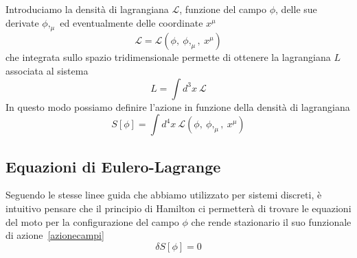     Introduciamo la densità di lagrangiana $\mathcal L$, funzione del campo $\phi$, delle sue derivate $\phi,_\mu$ ed eventualmente delle coordinate $x^\mu$
    \begin{equation} \label{lagrangianacampi}
        \mathcal L = \mathcal L (\phi,~\phi,_\mu,~x^\mu)
    \end{equation}
    che integrata sullo spazio tridimensionale permette di ottenere la lagrangiana $L$ associata al sistema
    \begin{equation*}
        L = \int d^3 x ~ \mathcal L
    \end{equation*}
    In questo modo possiamo definire l'azione in funzione della densità di lagrangiana
    \begin{equation} \label{azionecampi}
        S[\phi] = \int d^4 x ~ \mathcal L (\phi,~\phi,_\mu,~x^\mu)
    \end{equation}

\subsection{Equazioni di Eulero-Lagrange}

    Seguendo le stesse linee guida che abbiamo utilizzato per sistemi discreti, è intuitivo pensare che il principio di Hamilton ci permetterà di trovare le equazioni del moto per la configurazione del campo $\phi$ che rende stazionario il suo funzionale di azione~\eqref{azionecampi}
    \begin{equation} \label{azionestazionariacampi}
        \delta S [\phi] = 0
    \end{equation}

